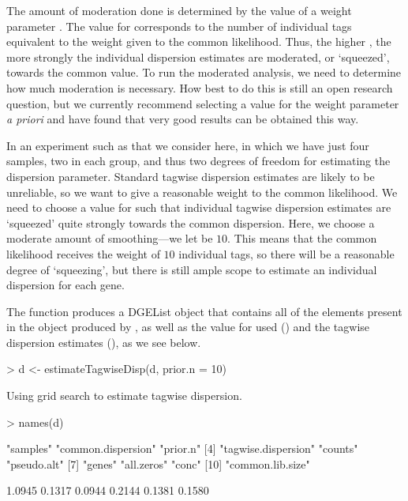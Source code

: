 The amount of moderation done is determined by the value of a weight
parameter . The value for  corresponds to
the number of individual tags equivalent to the weight given to the
common likelihood. Thus, the higher , the more strongly
the individual dispersion estimates are moderated, or `squeezed',
towards the common value. To run the moderated analysis, we need to
determine how much moderation is necessary. How best to do this is
still an open research question, but we currently recommend selecting
a value for the weight parameter  \emph{a priori} and
have found that very good results can be obtained this way.

In an experiment such as that we consider here, in which we have just
four samples, two in each group, and thus two degrees of freedom for
estimating the dispersion parameter. Standard tagwise dispersion
estimates are likely to be unreliable, so we want to give a reasonable
weight to the common likelihood. We need to choose a value for
 such that individual tagwise dispersion estimates are
`squeezed' quite strongly towards the common dispersion. Here, we
choose a moderate amount of smoothing---we let  be
$10$. This means that the common likelihood receives the weight of
$10$ individual tags, so there will be a reasonable degree of
`squeezing', but there is still ample scope to estimate an individual
dispersion for each gene.

The function  produces a DGEList object that
contains all of the elements present in the object produced by
, as well as the value for 
used () and the tagwise dispersion estimates
(), as we see below.

\begin{Schunk}
\begin{Sinput}
> d <- estimateTagwiseDisp(d, prior.n = 10)
\end{Sinput}
\begin{Soutput}
Using grid search to estimate tagwise dispersion. 
\end{Soutput}
\begin{Sinput}
> names(d)
\end{Sinput}
\begin{Soutput}
 [1] "samples"            "common.dispersion"  "prior.n"           
 [4] "tagwise.dispersion" "counts"             "pseudo.alt"        
 [7] "genes"              "all.zeros"          "conc"              
[10] "common.lib.size"   
\end{Soutput}
\begin{Soutput}
[1] 1.0945 0.1317 0.0944 0.2144 0.1381 0.1580
\end{Soutput}
\end{Schunk}

